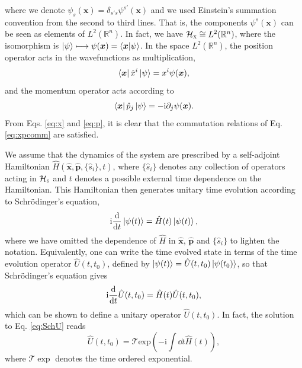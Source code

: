 \documentclass[prd,twocolumn,superscriptaddress,floatfix,amsmath,amssymb,amsfonts,longbibliography,nofootinbib]{revtex4-1}
\newcommand{\ii}{\mathrm{i}}
\begin{document}
where we denote $\psi_s(\bm x)=\delta_{s's}\psi^{s'}(\bm x)$ and we used Einstein's summation convention from the second to third lines. That is, the components $\psi^s(\bm x)$ can be seen as elements of $L^2(\mathbb{R}^n)$. In fact, we have $\mathcal{H}_\textsc{x}\cong L^2(\mathbb{R}^n)$, where the isomorphism is $\ket{\psi}\longmapsto \psi(\bm x) = \braket{\bm x}{\psi}$. In the space $L^2(\mathbb{R}^n)$, the position operator acts in the wavefunctions as multiplication,
\begin{equation}\label{eq:x}
    \bra{\bm x}\hat{x}^i \ket{\psi} = x^i \psi(\bm x),
\end{equation}
and the momentum operator acts according to
\begin{equation}\label{eq:p}
    \bra{\bm x} \hat{p}_j \ket{\psi} = - \ii \partial_j \psi(\bm x).
\end{equation}
From Eqs. \eqref{eq:x} and \eqref{eq:p}, it is clear that the commutation relations of Eq. \eqref{eq:xpcomm} are satisfied. 

We assume that the dynamics of the system are prescribed by a self-adjoint Hamiltonian $\hat{H}(\hat{\bm x},\hat{\bm p}, \{\hat{s}_i\},t)$, where  $\{\hat{s}_i\}$ denotes any collection of operators acting in $\mathcal{H}_\textsc{s}$ and $t$ denotes a possible external time dependence on the Hamiltonian. This Hamiltonian then generates unitary time evolution according to Schr\"odinger's equation,
\begin{equation}
    \ii\dv{}{t}\ket{\psi(t)} = \hat{H}(t)\ket{\psi(t)},
\end{equation}
where we have omitted the dependence of $\hat{H}$ in $\hat{\bm x}$, $\hat{\bm p}$ and $\{\hat{s}_i\}$ to lighten the notation. Equivalently, one can write the time evolved state in terms of the time evolution operator $\hat{U}(t,t_0)$, defined by $\ket{\psi(t)} = \hat{U}(t,t_0)\ket{\psi(t_0)}$, so that Schr\"odinger's equation gives
\begin{equation}\label{eq:SchU}
    \ii\dv{}{t}\hat{U}(t,t_0) = \hat{H}(t)\hat{U}(t,t_0),
\end{equation}
which can be shown to define a unitary operator $\hat{U}(t,t_0)$. In fact, the solution to Eq. \eqref{eq:SchU} reads
\begin{equation}
    \hat{U}(t,t_0) = \mathcal{T}\text{exp}\left(-\ii \int \dd t \hat{H}(t)\right),
\end{equation}
where $\mathcal{T}\exp$ denotes the time ordered exponential. %
\end{document}
